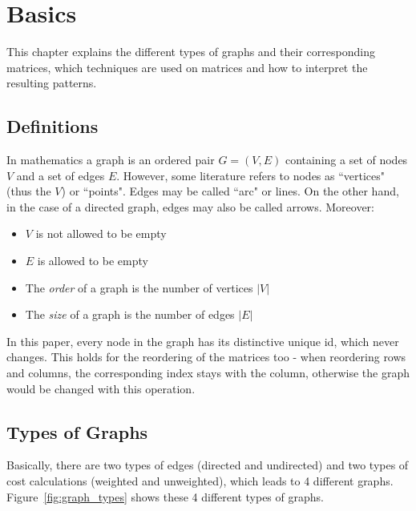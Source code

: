 %
%
% 
% 
% 


\chapter{Basics}\label{chap:Basics}


This chapter explains the different types of graphs and their corresponding matrices, which techniques are used on matrices and how to interpret the resulting patterns.

\section{Definitions}
In mathematics a graph is an ordered pair $G = (V, E)$ containing a set of nodes $V$ and a set of edges $E$. However, some literature refers to nodes as ``vertices" (thus the $V$) or ``points".
Edges may be called ``arc" or lines. 
On the other hand, in the case of a directed graph, edges may also be called arrows. Moreover: \begin{itemize}
	\item $V$ is not allowed to be empty
	\item $E$ is allowed to be empty
	\item The \textit{order} of a graph is the number of vertices $|V|$
	\item The \textit{size} of a graph is the number of edges $|E|$
\end{itemize}

In this paper, every node in the graph has its distinctive unique id, which never changes. This holds for the reordering of the matrices too - when reordering rows and columns, the corresponding index stays with the column, otherwise the graph would be changed with this operation.


\FloatBarrier
\section{Types of Graphs}

Basically, there are two types of edges (directed and undirected) and two types of cost calculations (weighted and unweighted), which leads to 4 different graphs. Figure~\ref{fig:graph_types} shows these 4 different types of graphs. 


